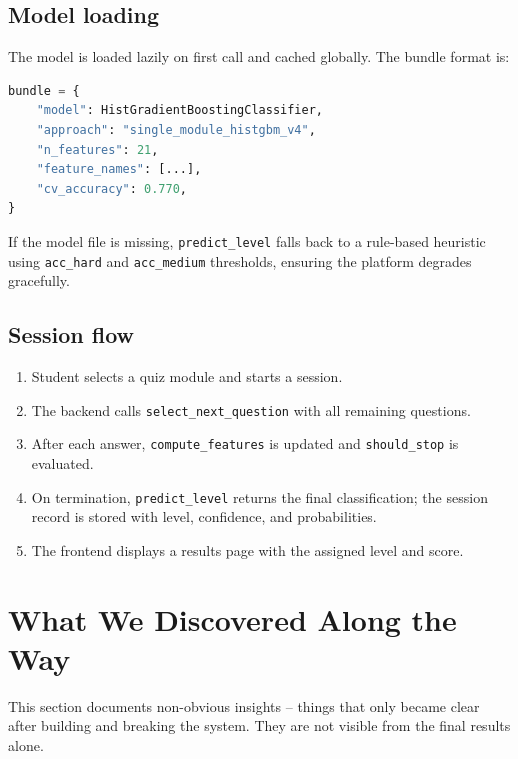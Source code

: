 \documentclass[12pt,a4paper]{article}
\begin{document}
\subsection{Model loading}

The model is loaded lazily on first call and cached globally. The bundle format is:
\begin{lstlisting}[language=Python]
bundle = {
    "model": HistGradientBoostingClassifier,
    "approach": "single_module_histgbm_v4",
    "n_features": 21,
    "feature_names": [...],
    "cv_accuracy": 0.770,
}
\end{lstlisting}

If the model file is missing, \texttt{predict\_level} falls back to a rule-based
heuristic using \texttt{acc\_hard} and \texttt{acc\_medium} thresholds, ensuring
the platform degrades gracefully.

\subsection{Session flow}

\begin{enumerate}[noitemsep]
  \item Student selects a quiz module and starts a session.
  \item The backend calls \texttt{select\_next\_question} with all remaining questions.
  \item After each answer, \texttt{compute\_features} is updated and \texttt{should\_stop}
        is evaluated.
  \item On termination, \texttt{predict\_level} returns the final classification;
        the session record is stored with level, confidence, and probabilities.
  \item The frontend displays a results page with the assigned level and score.
\end{enumerate}

\section{What We Discovered Along the Way}
\label{sec:discoveries}

This section documents non-obvious insights -- things that only became clear after
building and breaking the system. They are not visible from the final results alone.
\end{document}
